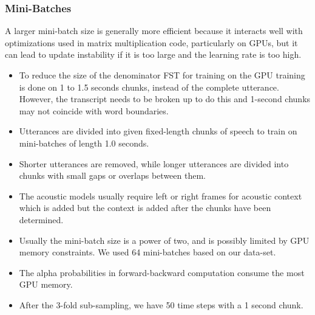 \subsubsection{Mini-Batches} 
A larger mini-batch size is generally more efficient because it interacts well with optimizations used in matrix multiplication code, particularly on GPUs, but it can lead to update instability if it is too large and the learning rate is too high. %
    \begin{itemize}
        \item To reduce the size of the denominator FST for training on the GPU training is done on 1 to 1.5 seconds chunks, instead of the complete utterance. However, the transcript needs to be broken up to do this and 1-second chunks may not coincide with word boundaries.
        \item Utterances are divided into given fixed-length chunks of speech to train on mini-batches of length 1.0 seconds. 
        \item Shorter utterances are removed, while longer utterances are divided into chunks with small gaps or overlaps between them.
        \item The acoustic models usually require left or right frames for acoustic context which is added but the context is added after the chunks have been determined. 
        \item Usually the mini-batch size is a power of two, and is possibly limited by GPU memory constraints. We used 64 mini-batches based on our data-set. 
        \item The alpha probabilities in forward-backward computation consume the most GPU memory. 
        \item After the 3-fold sub-sampling, we have 50 time steps with a 1 second chunk.
    \end{itemize}

